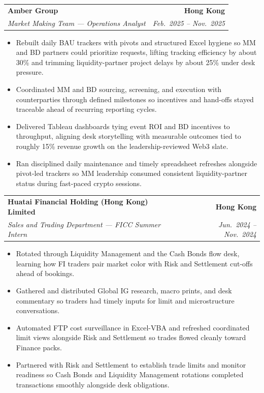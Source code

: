 \documentclass[9pt,a4paper]{extarticle}
\makeatletter
\newcommand{\resumeSubheading}[4]{%
  \vspace{0.6em}%
  \begin{tabular*}{\textwidth}{l@{\extracolsep{\fill}}r}
    \textbf{#1} & \textbf{#2} \\
    \textit{\small #3} & \textit{\small #4} \\
  \end{tabular*}\vspace{0.32em}}
\makeatother
\begin{document}
\resumeSubheading{Amber Group}{Hong Kong}{Market Making Team --- Operations Analyst}{Feb.\ 2025 -- Nov.\ 2025}
\begin{itemize}
  \item Rebuilt daily BAU trackers with pivots and structured Excel hygiene so MM and BD partners could prioritize requests, lifting tracking efficiency by about 30\% and trimming liquidity-partner project delays by about 25\% under desk pressure.
  \item Coordinated MM and BD sourcing, screening, and execution with counterparties through defined milestones so incentives and hand-offs stayed traceable ahead of recurring reporting cycles.
  \item Delivered Tableau dashboards tying event ROI and BD incentives to throughput, aligning desk storytelling with measurable outcomes tied to roughly 15\% revenue growth on the leadership-reviewed Web3 slate.
  \item Ran disciplined daily maintenance and timely spreadsheet refreshes alongside pivot-led trackers so MM leadership consumed consistent liquidity-partner status during fast-paced crypto sessions.
\end{itemize}

\resumeSubheading{Huatai Financial Holding (Hong Kong) Limited}{Hong Kong}{Sales and Trading Department --- FICC Summer Intern}{Jun.\ 2024 -- Nov.\ 2024}
\begin{itemize}
  \item Rotated through Liquidity Management and the Cash Bonds flow desk, learning how FI traders pair market color with Risk and Settlement cut-offs ahead of bookings.
  \item Gathered and distributed Global IG research, macro prints, and desk commentary so traders had timely inputs for limit and microstructure conversations.
  \item Automated FTP cost surveillance in Excel-VBA and refreshed coordinated limit views alongside Risk and Settlement so trades flowed cleanly toward Finance packs.
  \item Partnered with Risk and Settlement to establish trade limits and monitor readiness so Cash Bonds and Liquidity Management rotations completed transactions smoothly alongside desk obligations.
\end{itemize}
\end{document}
